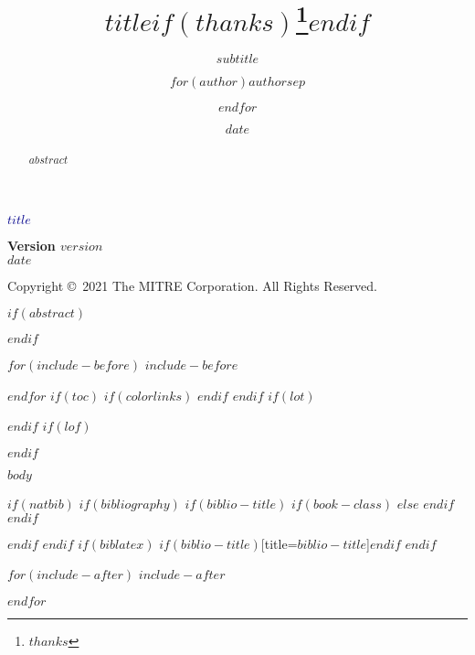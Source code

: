 \documentclass[12pt,letter,twoside]{article}
\title{$title$$if(thanks)$\thanks{$thanks$}$endif$}
\subtitle{$subtitle$}
\author{$for(author)$$author$$sep$ \and $endfor$}
\institute{$for(institute)$$institute$$sep$ \and $endfor$}
\date{$date$}
\begin{document}
\frontmatter

\begin{titlepage}
\raggedright
\vspace{30pt}
{
\Huge
\textsf{\textbf{\textcolor{DarkBlue}{$title$}}}\par
}
\vspace{200pt}
{
\Large
\textsf{\textbf{Version $version$}}\\
\vspace{5pt}
\textsf{\textbf{$date$}}\par
}

\vspace{200pt}

{

\textsf{Copyright \copyright\ 2021 The MITRE Corporation. All Rights Reserved.}
}
\end{titlepage}

\pagestyle{fancy}
\renewcommand{\sectionmark}[1]{\markright{\thesection.\ #1}{}}
\fancyhf{}
\fancyhead[LE,RO]{}
\renewcommand{\headrulewidth}{0.4pt}
\renewcommand{\footrulewidth}{0.4pt}
\fancypagestyle{plain}{
  \fancyhf{}
  \renewcommand{\footrulewidth}{0pt}
  \renewcommand{\headrulewidth}{0pt}
}

\cleardoublepage

$if(abstract)$
\begin{abstract}
$abstract$
\end{abstract}
$endif$

$for(include-before)$
$include-before$

$endfor$
$if(toc)$
{
$if(colorlinks)$
\hypersetup{linkcolor=$if(toccolor)$$toccolor$$else$$endif$}
$endif$
\setcounter{tocdepth}{$toc-depth$}
\tableofcontents
}
$endif$
$if(lot)$
\listoftables
$endif$
$if(lof)$
\listoffigures
$endif$

\cleardoublepage
\mainmatter

$body$

$if(natbib)$
$if(bibliography)$
$if(biblio-title)$
$if(book-class)$
\renewcommand\bibname{$biblio-title$}
$else$
\renewcommand\refname{$biblio-title$}
$endif$
$endif$


$endif$
$endif$
$if(biblatex)$
\printbibliography$if(biblio-title)$[title=$biblio-title$]$endif$
$endif$

\clearpage
\backmatter

$for(include-after)$
$include-after$

$endfor$
\clearpage
\end{document}
